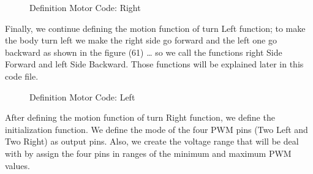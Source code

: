 \begin{figure}[h]
  \centering
  \hfill
  \caption{Definition Motor Code: Right}
\end{figure}

Finally, we continue defining the motion function of turn Left function; to make the body turn left we make the right side go forward and the left one go backward as shown in the figure (61) … so we call the functions right Side Forward and left Side Backward. Those functions will be explained later in this code file.

\begin{figure}[h]
  \centering
  \hfill
  \caption{Definition Motor Code: Left}
\end{figure}


After defining the motion function of turn Right function, we define the initialization function. We define the mode of the four PWM pins (Two Left and Two Right) as output pins. Also, we create the voltage range that will be deal with by assign the four pins in ranges of the minimum and maximum PWM values.

